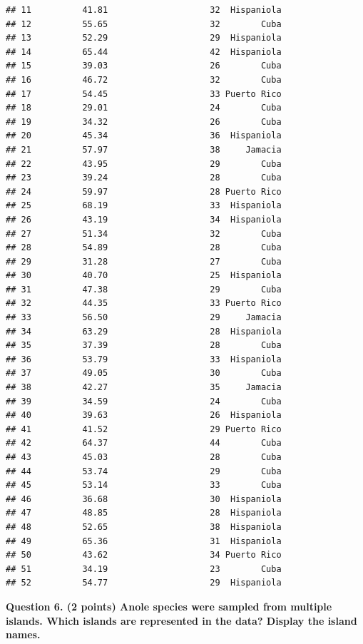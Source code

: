 \documentclass[
]{article}
\begin{document}
\begin{verbatim}
## 11          41.81                    32  Hispaniola
## 12          55.65                    32        Cuba
## 13          52.29                    29  Hispaniola
## 14          65.44                    42  Hispaniola
## 15          39.03                    26        Cuba
## 16          46.72                    32        Cuba
## 17          54.45                    33 Puerto Rico
## 18          29.01                    24        Cuba
## 19          34.32                    26        Cuba
## 20          45.34                    36  Hispaniola
## 21          57.97                    38     Jamacia
## 22          43.95                    29        Cuba
## 23          39.24                    28        Cuba
## 24          59.97                    28 Puerto Rico
## 25          68.19                    33  Hispaniola
## 26          43.19                    34  Hispaniola
## 27          51.34                    32        Cuba
## 28          54.89                    28        Cuba
## 29          31.28                    27        Cuba
## 30          40.70                    25  Hispaniola
## 31          47.38                    29        Cuba
## 32          44.35                    33 Puerto Rico
## 33          56.50                    29     Jamacia
## 34          63.29                    28  Hispaniola
## 35          37.39                    28        Cuba
## 36          53.79                    33  Hispaniola
## 37          49.05                    30        Cuba
## 38          42.27                    35     Jamacia
## 39          34.59                    24        Cuba
## 40          39.63                    26  Hispaniola
## 41          41.52                    29 Puerto Rico
## 42          64.37                    44        Cuba
## 43          45.03                    28        Cuba
## 44          53.74                    29        Cuba
## 45          53.14                    33        Cuba
## 46          36.68                    30  Hispaniola
## 47          48.85                    28  Hispaniola
## 48          52.65                    38  Hispaniola
## 49          65.36                    31  Hispaniola
## 50          43.62                    34 Puerto Rico
## 51          34.19                    23        Cuba
## 52          54.77                    29  Hispaniola
\end{verbatim}

\hfill\break
\hfill\break
\hfill\break

\textbf{Question 6. (2 points) Anole species were sampled from multiple
islands. Which islands are represented in the data? Display the island
names.}
\end{document}
